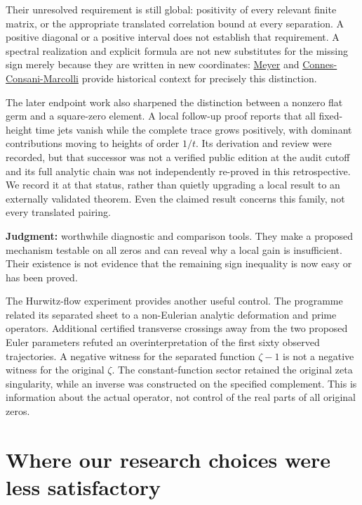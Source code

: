 \documentclass[
  british,
  11pt,
  a4paper,
]{article}
\begin{document}
Their unresolved requirement is still global: positivity of every
relevant finite matrix, or the appropriate translated correlation bound
at every separation. A positive diagonal or a positive interval does not
establish that requirement. A spectral realization and explicit formula
are not new substitutes for the missing sign merely because they are
written in new coordinates:
\href{https://arxiv.org/abs/math/0412277v3}{Meyer} and
\href{https://arxiv.org/abs/math/0703392v1}{Connes-Consani-Marcolli}
provide historical context for precisely this distinction.

The later endpoint work also sharpened the distinction between a nonzero
flat germ and a square-zero element. A local follow-up proof reports
that all fixed-height time jets vanish while the complete trace grows
positively, with dominant contributions moving to heights of order
\(1/t\). Its derivation and review were recorded, but that successor was
not a verified public edition at the audit cutoff and its full analytic
chain was not independently re-proved in this retrospective. We record
it at that status, rather than quietly upgrading a local result to an
externally validated theorem. Even the claimed result concerns this
family, not every translated pairing.

\textbf{Judgment:} worthwhile diagnostic and comparison tools. They make
a proposed mechanism testable on all zeros and can reveal why a local
gain is insufficient. Their existence is not evidence that the remaining
sign inequality is now easy or has been proved.

The Hurwitz-flow experiment provides another useful control. The
programme related its separated sheet to a non-Eulerian analytic
deformation and prime operators. Additional certified transverse
crossings away from the two proposed Euler parameters refuted an
overinterpretation of the first sixty observed trajectories. A negative
witness for the separated function \(\zeta-1\) is not a negative witness
for the original \(\zeta\). The constant-function sector retained the
original zeta singularity, while an inverse was constructed on the
specified complement. This is information about the actual operator, not
control of the real parts of all original zeros.

\section{Where our research choices were less
satisfactory}\label{where-our-research-choices-were-less-satisfactory}
\end{document}
